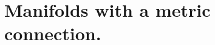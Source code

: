 \documentclass{report}
\begin{document}








\chapter{Manifolds with a metric connection.}









\end{document}
